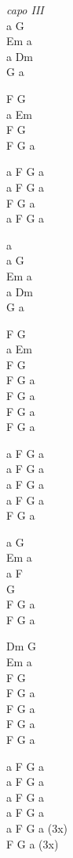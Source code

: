 \begin{chord}
    \begin{tinyTwelve}
    \textit{capo III}\\
    a G\\
    Em a\\
    a Dm\\
    G a

    F G\\
    a Em\\
    F G\\
    F G a

    a F G a\\
    a F G a\\
    F G a\\
    a F G a

    a\\
    a G\\
    Em a\\
    a Dm\\
    G a

    F G\\
    a  Em\\
    F G\\
    F G a\\
    F G a\\
    F G a\\
    F G a

    a F G a\\
    a F G a\\
    a F G a\\
    a F G a\\
    F G a

a G\\
Em a\\
a F\\
G\\
F G a\\
F G a

Dm G\\
Em a\\
F G\\
F G a\\
F G a\\
F G a\\
F G a

a F G a\\
a F G a\\
a F G a\\
a F G a\\
a F G a (3x)\\
F G a (3x)
\end{tinyTwelve}
\end{chord}
